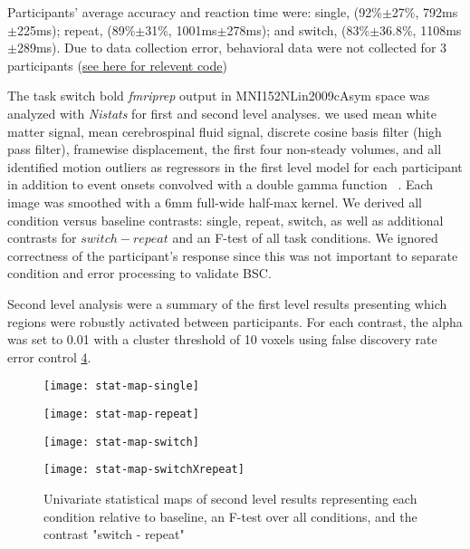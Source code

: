 \documentclass[10pt,letterpaper]{article}
\begin{document}
Participants' average accuracy and reaction time were:
single, (92\%$\pm$27\%, 792ms$\pm$225ms); repeat, (89\%$\pm$31\%, 1001ms$\pm$278ms);
and switch, (83\%$\pm$36.8\%, 1108ms$\pm$289ms).
Due to data collection error, behavioral data were not collected for 3 participants
(\href{https://github.com/jdkent/BetaSeriesRealDataAnalysis/blob/90fafb5b83b2e1bfade61a9fb1a87f225efaa95f/summarizeBehavior/summarize_behavior.ipynb}{see here for relevent code})

The task switch bold \emph{fmriprep} output in MNI152NLin2009cAsym space
was analyzed with \emph{Nistats} for first and second level analyses.
we used mean white matter signal, mean cerebrospinal fluid signal,
discrete cosine basis filter (high pass filter), framewise displacement, the first four non-steady volumes, and
all identified motion outliers as regressors in the first level model for each participant
in addition to event onsets convolved with a double gamma function ~\cite{Glover1999}.
Each image was smoothed with a 6mm full-wide half-max kernel.
We derived all condition versus baseline contrasts: single, repeat, switch, as well as
additional contrasts for $switch - repeat$ and an F-test of all task conditions.
We ignored correctness of the participant's response since this was not important to
separate condition and error processing to validate BSC.

Second level analysis were a summary of the first level results presenting which
regions were robustly activated between participants.
For each contrast, the alpha was set to 0.01 with a cluster threshold of 10 voxels using
false discovery rate error control \ref{fig:stat_maps}.

\begin{figure}[H]
  \centering
  \texttt{[image: stat-map-single]}
  \label{fig:single}
\end{figure}

\begin{figure}[H]
  \centering
  \texttt{[image: stat-map-repeat]}
  \label{fig:repeat}
\end{figure}

\begin{figure}[H]
  \centering
  \texttt{[image: stat-map-switch]}
  \label{fig:switch}
\end{figure}

\begin{figure}[H]
  \centering
  \texttt{[image: stat-map-switchXrepeat]}
  \caption{
    Univariate statistical maps of second level results representing
    each condition relative to baseline, an F-test over all conditions,
    and the contrast "switch - repeat"}
  \label{fig:stat_maps}
\end{figure}
\end{document}
